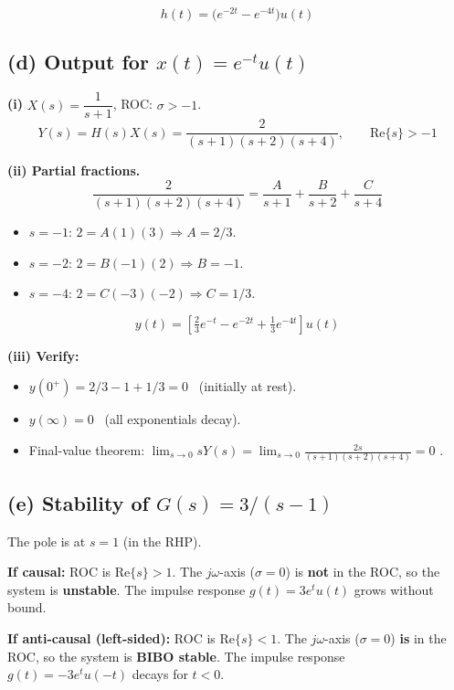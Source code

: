 \documentclass[11pt]{article}
\newcommand{\Res}{\mathrm{Re}}
\begin{document}
\begin{equation*}
\boxed{h(t) = \bigl(e^{-2t} - e^{-4t}\bigr)u(t)}
\end{equation*}

\subsection*{(d) Output for $x(t) = e^{-t}u(t)$}

\textbf{(i)} $X(s) = \dfrac{1}{s+1}$, ROC: $\sigma > -1$.
\[
Y(s) = H(s)X(s) = \frac{2}{(s+1)(s+2)(s+4)}, \qquad \Res\{s\} > -1
\]

\textbf{(ii) Partial fractions.}
\[
\frac{2}{(s+1)(s+2)(s+4)} = \frac{A}{s+1} + \frac{B}{s+2} + \frac{C}{s+4}
\]
\begin{itemize}[leftmargin=2em]
\item $s=-1$: $2 = A(1)(3) \Rightarrow A = 2/3$.
\item $s=-2$: $2 = B(-1)(2) \Rightarrow B = -1$.
\item $s=-4$: $2 = C(-3)(-2) \Rightarrow C = 1/3$.
\end{itemize}

\begin{equation*}
\boxed{y(t) = \left[\tfrac{2}{3}e^{-t} - e^{-2t} + \tfrac{1}{3}e^{-4t}\right]u(t)}
\end{equation*}

\textbf{(iii) Verify:}
\begin{itemize}[leftmargin=2em]
\item $y(0^+) = 2/3 - 1 + 1/3 = 0$ \checkmark\ (initially at rest).
\item $y(\infty) = 0$ \checkmark\ (all exponentials decay).
\item Final-value theorem: $\displaystyle\lim_{s\to 0}sY(s) = \lim_{s\to 0}\frac{2s}{(s+1)(s+2)(s+4)} = 0$ \checkmark.
\end{itemize}

\subsection*{(e) Stability of $G(s) = 3/(s-1)$}

The pole is at $s=1$ (in the RHP).

\textbf{If causal:} ROC is $\Res\{s\} > 1$. The $j\omega$-axis ($\sigma=0$) is \textbf{not} in the ROC, so the system is \textbf{unstable}. The impulse response $g(t) = 3e^{t}u(t)$ grows without bound.

\textbf{If anti-causal (left-sided):} ROC is $\Res\{s\} < 1$. The $j\omega$-axis ($\sigma=0$) \textbf{is} in the ROC, so the system is \textbf{BIBO stable}. The impulse response $g(t) = -3e^{t}u(-t)$ decays for $t<0$.
\end{document}
